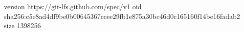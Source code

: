 version https://git-lfs.github.com/spec/v1
oid sha256:c5e8ad4df9be0b00645367ccee29fb1e875a30bc46d0c165160f14be16fadab2
size 1398256
